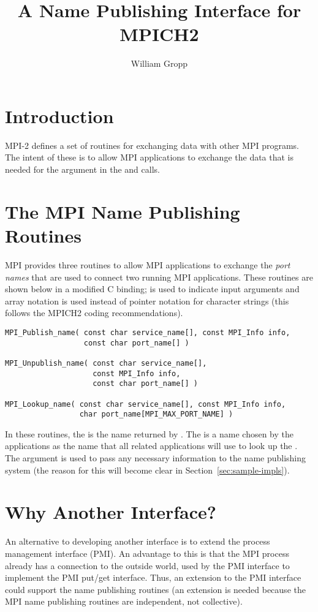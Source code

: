 \documentclass{article}
\begin{document}
\title{A Name Publishing Interface for MPICH2}
\author{William Gropp}
\maketitle

\section{Introduction}

MPI-2 defines a set of routines for exchanging data with other MPI
programs.  The intent of these is to allow MPI applications to 
exchange the data that is needed for the  argument in the
 and  calls.  

\section{The MPI Name Publishing Routines}
MPI provides three routines to allow MPI applications to exchange the
\emph{port names} that are used to connect two running MPI
applications.  These routines are shown below in a modified C binding;
 is used to indicate input arguments and array notation is
used instead of pointer notation for character strings (this follows
the MPICH2 coding recommendations).
\begin{verbatim}
MPI_Publish_name( const char service_name[], const MPI_Info info, 
                  const char port_name[] )

MPI_Unpublish_name( const char service_name[], 
                    const MPI_Info info, 
                    const char port_name[] )

MPI_Lookup_name( const char service_name[], const MPI_Info info, 
                 char port_name[MPI_MAX_PORT_NAME] )
\end{verbatim}
In these routines, the  is the name returned by
.  
The  is a name chosen by the
applications as the name that all related applications will use to
look up the .
The  argument is used to pass any necessary information to
the name publishing system (the reason for this will become clear in
Section~\ref{sec:sample-impls}). 

\section{Why Another Interface?}
An alternative to developing another interface is to extend the
process management interface (PMI).  An advantage to this is that the
MPI process already has a connection to the outside world, used by the
PMI interface to implement the PMI put/get interface.  Thus, an
extension to the PMI interface could support the name publishing
routines (an extension is needed because the MPI name publishing
routines are independent, not collective).
\end{document}
